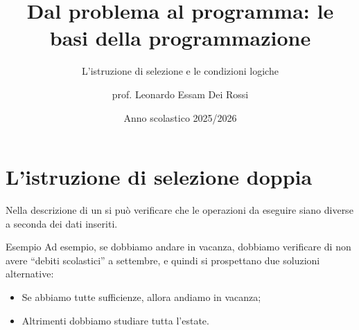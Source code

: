 \documentclass[
    notheorems,
    11pt,
    compress,
    aspectratio=169
]{beamer}
\title[L'istruzione di selezione e le condizioni logiche]{Dal problema al programma: le basi della programmazione}
\subtitle{L'istruzione di selezione e le condizioni logiche}
\author{prof. Leonardo Essam Dei Rossi}
\institute[]{ITT "M. Buonarroti" - Trento (TN)}
\date[A.S. 2025/2026]{Anno scolastico 2025/2026}
\begin{document}
\begin{frame}
    \titlepage
\end{frame}




\section{L'istruzione di selezione doppia}

\begin{frame}

    Nella descrizione di un  si può verificare che le operazioni da eseguire siano diverse a seconda dei dati inseriti.

    \pause
    \vspace{\baselineskip}

    \begin{block}{Esempio}
        Ad esempio, se dobbiamo andare in vacanza, dobbiamo verificare di non avere “debiti scolastici” a settembre, e quindi si prospettano due soluzioni alternative:

        \begin{itemize}
            \item \alert{Se} abbiamo tutte sufficienze, \alert{allora} andiamo in vacanza;
            \item \alert{Altrimenti} dobbiamo studiare tutta l’estate.
        \end{itemize}
    \end{block}
\end{frame}
\end{document}
